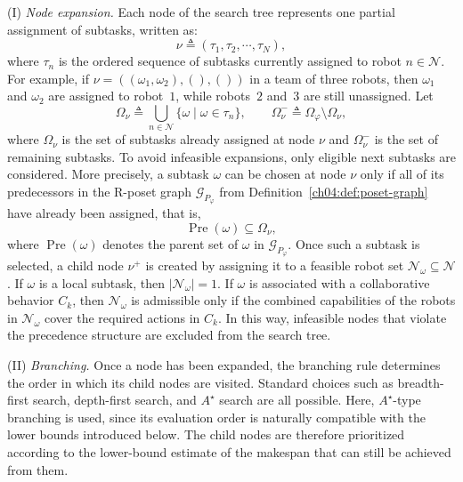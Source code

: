 (I) \emph{Node expansion.}
Each node of the search tree represents one partial assignment of subtasks,
written as:
\begin{equation}
\label{ch04:eq:node}
\nu \triangleq (\tau_{1},\tau_{2},\cdots,\tau_{N}),
\end{equation}
where $\tau_{n}$ is the ordered sequence of subtasks currently assigned to
robot $n\in\mathcal{N}$. For example, if
$\nu=((\omega_{1},\omega_{2}),(),())$ in a team of three robots, then
$\omega_{1}$ and $\omega_{2}$ are assigned to robot~$1$, while robots~$2$
and~$3$ are still unassigned. Let
\[
\Omega_{\nu} \triangleq \bigcup_{n\in\mathcal{N}}\{\omega \mid \omega\in\tau_n\},
\qquad
\Omega_{\nu}^{-} \triangleq \Omega_{\varphi}\setminus\Omega_{\nu},
\]
where $\Omega_{\nu}$ is the set of subtasks already assigned at node $\nu$ and
$\Omega_{\nu}^{-}$ is the set of remaining subtasks.
To avoid infeasible expansions, only eligible next subtasks are considered.
More precisely, a subtask $\omega$ can be chosen at node $\nu$ only if all of
its predecessors in the R-poset graph
$\mathcal{G}_{P_{\varphi}}$ from
Definition~\ref{ch04:def:poset-graph} have already been assigned, that is,
\begin{equation}
\label{ch04:eq:next-task}
\operatorname{Pre}(\omega)\subseteq\Omega_{\nu},
\end{equation}
where $\operatorname{Pre}(\omega)$ denotes the parent set of $\omega$ in
$\mathcal{G}_{P_{\varphi}}$. Once such a subtask is selected, a child node
$\nu^{+}$ is created by assigning it to a feasible robot set
$\mathcal{N}_{\omega}\subseteq\mathcal{N}$. If $\omega$ is a local subtask,
then $|\mathcal{N}_{\omega}|=1$. If $\omega$ is associated with a
collaborative behavior $C_{k}$, then $\mathcal{N}_{\omega}$ is admissible only
if the combined capabilities of the robots in $\mathcal{N}_{\omega}$ cover the
required actions in $C_{k}$. In this way, infeasible nodes that violate the
precedence structure are excluded from the search tree.

(II) \emph{Branching.}
Once a node has been expanded, the branching rule determines the order in which
its child nodes are visited. Standard choices such as breadth-first search,
depth-first search, and $A^{\star}$ search are all possible. Here,
$A^{\star}$-type branching is used, since its evaluation order is naturally
compatible with the lower bounds introduced below. The child nodes are therefore
prioritized according to the lower-bound estimate of the makespan that can
still be achieved from them.

